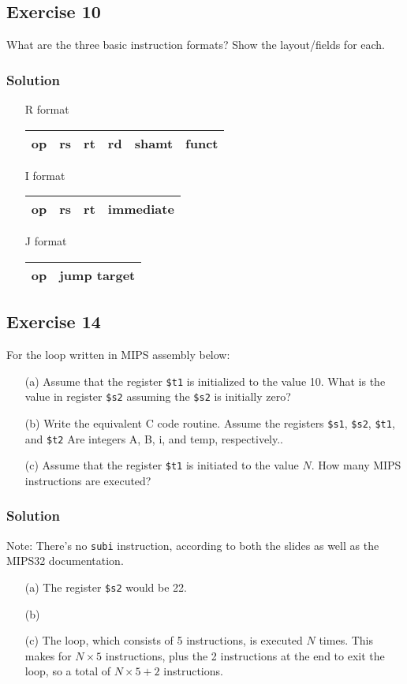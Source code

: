 \documentclass[12pt]{article}
\begin{document}
\subsection*{Exercise 10}
What are the three basic instruction formats? Show the layout/fields for each.
\subsubsection*{Solution}
\begin{itemize}
\item[R format]
\begin{tabular}{| C{2cm} | C{2cm} | C{2cm} | C{2cm} | C{2cm} | C{2cm} |}
\hline
op & rs & rt & rd & shamt & funct \\
\hline
\end{tabular}
\item[I format]
\begin{tabular}{| C{2cm} | C{2cm} | C{2cm} | C{6.9cm} |}
\hline
op & rs & rt & immediate \\
\hline
\end{tabular}
\item[J format]
\begin{tabular}{| C{2cm} | C{11.8cm} |}
\hline
op & jump target \\
\hline
\end{tabular}
\end{itemize}

\subsection*{Exercise 14}
For the loop written in MIPS assembly below:
\begin{itemize}
\item[(a)] Assume that the register {\tt\$t1} is initialized to the value 10. What is the value in register {\tt\$s2} assuming the {\tt\$s2} is initially zero?
\item[(b)] Write the equivalent C code routine. Assume the registers {\tt\$s1}, {\tt\$s2}, {\tt\$t1}, and {\tt\$t2} Are integers A, B, i, and temp, respectively..
\item[(c)] Assume that the register {\tt\$t1} is initiated to the value $N$. How many MIPS instructions are executed?
\end{itemize}

\subsubsection*{Solution}
Note: There's no {\tt subi} instruction, according to both the slides as well as the MIPS32 documentation.
\begin{itemize}
\item[(a)] The register {\tt\$s2} would be 22.
\item[(b)] 
\item[(c)] The loop, which consists of 5 instructions, is executed $N$ times. This makes for $N \times 5$ instructions, plus the 2 instructions at the end to exit the loop, so a total of $\boxed{N \times 5 + 2}$ instructions.
\end{itemize}
\end{document}
